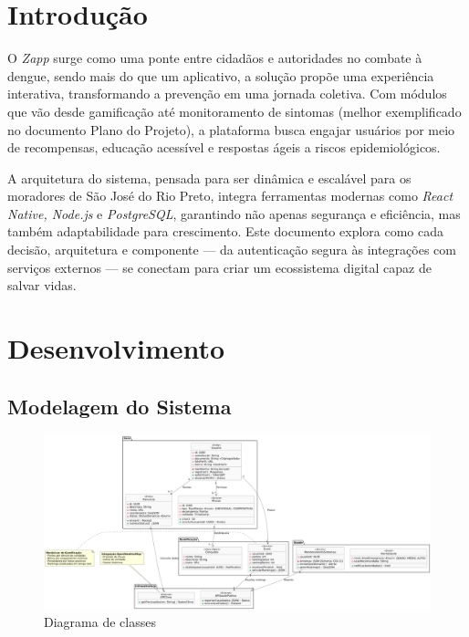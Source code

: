 \documentclass[a4paper, 12pt]{article}
\begin{document}


\newpage
\section{Introdução}

O \textit{Zapp} surge como uma ponte entre cidadãos e autoridades no combate à dengue, sendo mais do que um aplicativo, a solução propõe uma experiência interativa, transformando a prevenção em uma jornada coletiva. Com módulos que vão desde gamificação até monitoramento de sintomas (melhor exemplificado no documento Plano do Projeto), a plataforma busca engajar usuários por meio de recompensas, educação acessível e respostas ágeis a riscos epidemiológicos.

A arquitetura do sistema, pensada para ser dinâmica e escalável para os moradores de São José do Rio Preto, integra ferramentas modernas como \textit{React Native, Node.js} e \textit{PostgreSQL}, garantindo não apenas segurança e eficiência, mas também adaptabilidade para crescimento. Este documento explora como cada decisão, arquitetura e componente — da autenticação segura às integrações com serviços externos — se conectam para criar um ecossistema digital capaz de salvar vidas.

\newpage
\section{Desenvolvimento}

\subsection{Modelagem do Sistema}

\begin{figure}[H]
    \centering
    \includegraphics[width=1\textwidth]{dist/Diagrama de clases.png}
    \caption{Diagrama de classes}
    \label{fig:arquitetura}
\end{figure}
\end{document}
